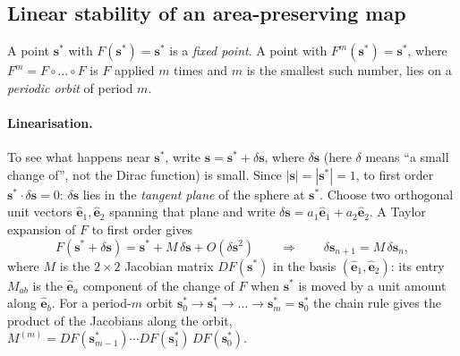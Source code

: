 \documentclass[11pt,a4paper]{article}
\newcommand{\vs}{\bm{s}}
\begin{document}
\subsection{Linear stability of an area-preserving map}

A point $\vs^*$ with $F(\vs^*) = \vs^*$ is a \emph{fixed point}. A point with $F^m(\vs^*) = \vs^*$, where $F^m = F\circ
\dots\circ F$ is $F$ applied $m$ times and $m$ is the smallest such number, lies on a \emph{periodic orbit} of period
$m$.

\paragraph{Linearisation.} To see what happens near $\vs^*$, write $\vs = \vs^* + \delta\vs$, where $\delta\vs$ (here
$\delta$ means ``a small change of'', not the Dirac function) is small. Since $|\vs| = |\vs^*| = 1$, to first order
$\vs^*\cdot\delta\vs = 0$: $\delta\vs$ lies in the \emph{tangent plane} of the sphere at $\vs^*$. Choose two orthogonal
unit vectors $\hat{\bm e}_1, \hat{\bm e}_2$ spanning that plane and write $\delta\vs = a_1\hat{\bm e}_1 + a_2\hat{\bm
e}_2$. A Taylor expansion of $F$ to first order gives
\begin{equation}
  F(\vs^* + \delta\vs) = \vs^* + M\,\delta\vs + O(\delta\vs^2)
  \qquad\Longrightarrow\qquad
  \delta\vs_{n+1} = M\,\delta\vs_n ,
\end{equation}
where $M$ is the $2\times2$ Jacobian matrix $DF(\vs^*)$ in the basis $(\hat{\bm e}_1, \hat{\bm e}_2)$: its entry $M_{ab}$
is the $\hat{\bm e}_a$ component of the change of $F$ when $\vs^*$ is moved by a unit amount along $\hat{\bm e}_b$. For a
period-$m$ orbit $\vs^*_0\to\vs^*_1\to\dots\to\vs^*_m = \vs^*_0$ the chain rule gives the product of the Jacobians along
the orbit, $M^{(m)} = DF(\vs^*_{m-1})\cdots DF(\vs^*_1)\,DF(\vs^*_0)$.
\end{document}
